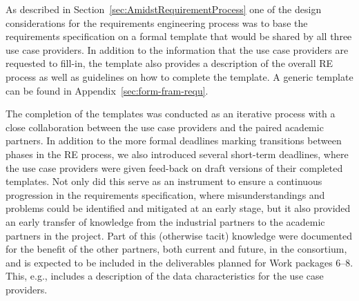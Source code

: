 


As described in Section~\ref{sec:AmidstRequirementProcess} one of the design considerations for the requirements
engineering process was to base the requirements specification on a formal template that would be shared by
all three use case providers. In addition to the information that the use case providers are requested to fill-in, the
template also provides a description of the overall RE process as well as guidelines on how to
complete the template. A generic template can be found in Appendix~\ref{sec:form-fram-requ}.

  

The completion of the templates was conducted as an iterative process with a close collaboration between the use case
providers and the paired academic partners. In addition to the more formal deadlines marking transitions between 
phases in the RE process, we also introduced several short-term deadlines, where
the use case providers were given feed-back on draft versions of their completed templates. Not only did this serve as an
instrument to ensure a continuous progression in the requirements specification, where misunderstandings and problems
could be identified and mitigated at an early stage, but it also provided an early transfer of knowledge from the
industrial partners to the academic partners in the project. Part of this (otherwise tacit) knowledge were documented
for the benefit of the other partners, both current and future, in the consortium, and is expected to be included 
in the deliverables planned for Work packages 6--8. This, e.g., includes a description of the data characteristics for
the use case providers. 

